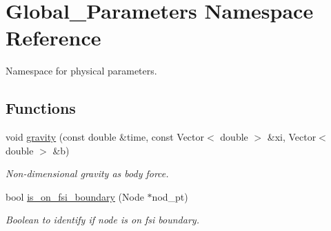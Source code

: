 \hypertarget{namespaceGlobal__Parameters}{}\section{Global\+\_\+\+Parameters Namespace Reference}
\label{namespaceGlobal__Parameters}


Namespace for physical parameters.  


\subsection*{Functions}
\begin{DoxyCompactItemize}
\item 
void \hyperlink{namespaceGlobal__Parameters_a200109847bf4cc26da4d00e8d68d569e}{gravity} (const double \&time, const Vector$<$ double $>$ \&xi, Vector$<$ double $>$ \&b)
\begin{DoxyCompactList}\small\item\em Non-\/dimensional gravity as body force. \end{DoxyCompactList}\item 
bool \hyperlink{namespaceGlobal__Parameters_a655abf819eb3045dac883f2b7073ba22}{is\+\_\+on\+\_\+fsi\+\_\+boundary} (Node $\ast$nod\+\_\+pt)
\begin{DoxyCompactList}\small\item\em Boolean to identify if node is on fsi boundary. \end{DoxyCompactList}\end{DoxyCompactItemize}
